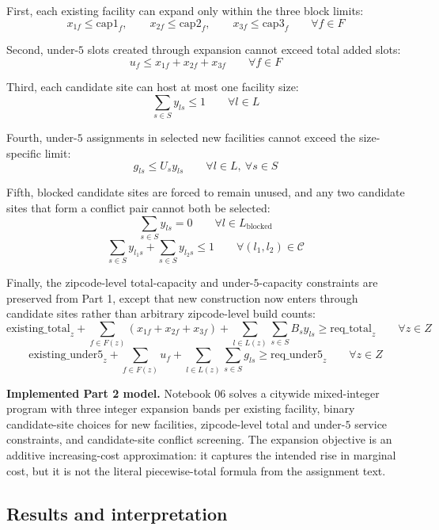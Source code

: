 \documentclass[11pt]{article}
\newcommand{\1}{\mathbb{I}}
\begin{document}
First, each existing facility can expand only within the three block limits:
\[
x_{1f} \le \mathrm{cap1}_f,\qquad
x_{2f} \le \mathrm{cap2}_f,\qquad
x_{3f} \le \mathrm{cap3}_f
\qquad \forall f \in F
\]

Second, under-\(5\) slots created through expansion cannot exceed total added slots:
\[
u_f \le x_{1f} + x_{2f} + x_{3f}
\qquad \forall f \in F
\]

Third, each candidate site can host at most one facility size:
\[
\sum_{s \in S} y_{ls} \le 1
\qquad \forall l \in L
\]

Fourth, under-\(5\) assignments in selected new facilities cannot exceed the size-specific limit:
\[
g_{ls} \le U_s y_{ls}
\qquad \forall l \in L,\ \forall s \in S
\]

Fifth, blocked candidate sites are forced to remain unused, and any two candidate sites that form a conflict pair cannot both be selected:
\[
\sum_{s \in S} y_{ls} = 0
\qquad \forall l \in L_{\text{blocked}}
\]
\[
\sum_{s \in S} y_{l_1 s} + \sum_{s \in S} y_{l_2 s} \le 1
\qquad \forall (l_1,l_2) \in \mathcal{C}
\]

Finally, the zipcode-level total-capacity and under-\(5\)-capacity constraints are preserved from Part 1, except that new construction now enters through candidate sites rather than arbitrary zipcode-level build counts:
\[
\mathrm{existing\_total}_z
+
\sum_{f \in F(z)} (x_{1f}+x_{2f}+x_{3f})
+
\sum_{l \in L(z)} \sum_{s \in S} B_s y_{ls}
\ge \mathrm{req\_total}_z
\qquad \forall z \in Z
\]
\[
\mathrm{existing\_under5}_z
+
\sum_{f \in F(z)} u_f
+
\sum_{l \in L(z)} \sum_{s \in S} g_{ls}
\ge \mathrm{req\_under5}_z
\qquad \forall z \in Z
\]

\begin{resultbox}
\textbf{Implemented Part 2 model.}
Notebook 06 solves a citywide mixed-integer program with three integer expansion bands per existing facility, binary candidate-site choices for new facilities, zipcode-level total and under-\(5\) service constraints, and candidate-site conflict screening. The expansion objective is an additive increasing-cost approximation: it captures the intended rise in marginal cost, but it is not the literal piecewise-total formula from the assignment text.
\end{resultbox}

\subsection{Results and interpretation}
\end{document}
